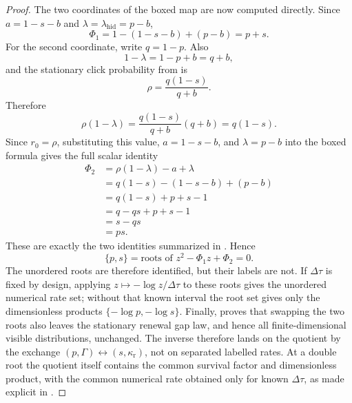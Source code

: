\begin{proof}
The two coordinates of the boxed map are now computed directly.  Since
\(a=1-s-b\) and \(\lambda=\lambda_{\mathrm{hid}}=p-b\),
\[
\Phi_1=1-(1-s-b)+(p-b)=p+s.
\]
For the second coordinate, write \(q=1-p\).  Also
\[
1-\lambda=1-p+b=q+b,
\]
and the stationary click probability from  is
\[
\rho=\frac{q(1-s)}{q+b}.
\]
Therefore
\[
\rho(1-\lambda)
=\frac{q(1-s)}{q+b}(q+b)
=q(1-s).
\]
Since \(r_0=\rho\), substituting this value, \(a=1-s-b\), and
\(\lambda=p-b\) into the boxed formula gives the full scalar identity
\[
\begin{aligned}
\Phi_2
&=\rho(1-\lambda)-a+\lambda\\
&=q(1-s)-(1-s-b)+(p-b)\\
&=q(1-s)+p+s-1\\
&=q-qs+p+s-1\\
&=s-qs\\
&=ps .
\end{aligned}
\]
These are exactly the two identities summarized in
.  Hence
\[
\{p,s\}=\text{roots of }z^2-\Phi_1z+\Phi_2=0.
\]
The unordered roots are therefore identified, but their labels are not.  If
\(\Delta\tau\) is fixed by design, applying
\(z\mapsto-\log z/\Delta\tau\) to these roots gives the unordered numerical
rate set; without that known interval the root set gives only the
dimensionless products \(\{-\log p,-\log s\}\).  Finally,
 proves that swapping
the two roots also leaves the stationary renewal gap law, and hence all
finite-dimensional visible distributions, unchanged.  The inverse therefore
lands on the quotient by the exchange \((p,\Gamma)\leftrightarrow
(s,\kappa_{\mathrm r})\), not on separated labelled rates.  At a double root
the quotient itself contains the common survival factor and dimensionless
product, with the common numerical rate obtained only for known
\(\Delta\tau\), as made explicit in
.
\end{proof}

